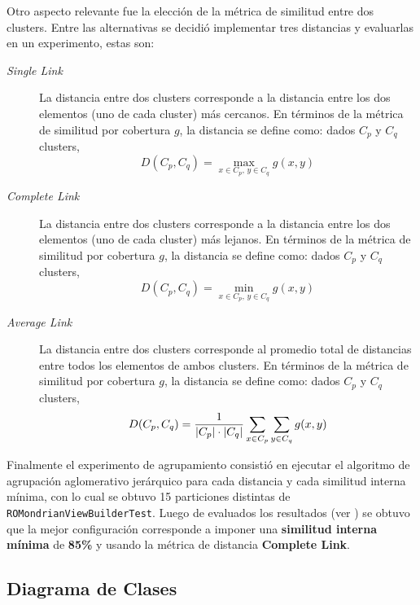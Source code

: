 \par Otro aspecto relevante fue la elección de la métrica de similitud entre dos clusters. Entre las alternativas se decidió implementar tres distancias y evaluarlas en un experimento, estas son: 
\begin{description}
\item[\emph{Single Link}] La distancia entre dos clusters corresponde a la distancia entre los dos elementos (uno de cada cluster) más cercanos. En términos de la métrica de similitud por cobertura $g$, la distancia se define como: dados $C_p$ y $C_q$ clusters,
\[ D(C_p,C_q) = \max_{x \in C_p,\, y  \in C_q} g(x,y) \]

\item[\emph{Complete Link}] La distancia entre dos clusters corresponde a la distancia entre los dos elementos (uno de cada cluster) más lejanos. En términos de la métrica de similitud por cobertura $g$, la distancia se define como: dados $C_p$ y $C_q$ clusters,
\[ D(C_p,C_q) = \min_{x \in C_p,\, y  \in C_q} g(x,y) \]

\item[\emph{Average Link}] La distancia entre dos clusters corresponde al promedio total de distancias entre todos los elementos de ambos clusters.  En términos de la métrica de similitud por cobertura $g$, la distancia se define como: dados $C_p$ y $C_q$ clusters,
\[ D(C_p,C_q) = \dfrac{1}{\vert C_p \vert\cdot\vert C_q \vert} \sum_{x \in C_p} \sum_{y  \in C_q} g(x,y) \]


\end{description}


\par Finalmente el experimento de agrupamiento consistió en ejecutar el algoritmo de agrupación aglomerativo jerárquico para cada distancia y cada similitud interna mínima, con lo cual se obtuvo 15 particiones distintas de {\tt ROMondrianViewBuilderTest}. Luego de evaluados los resultados (ver ) se obtuvo que la mejor configuración corresponde a imponer una \textbf{similitud interna mínima} de \textbf{85\%} y usando la métrica de distancia \textbf{Complete Link}.

\clearpage
\subsection{Diagrama de Clases}

